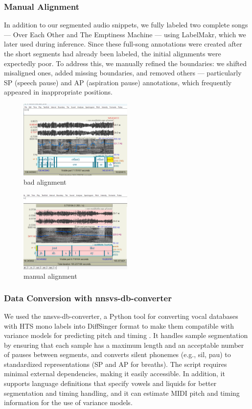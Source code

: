 \documentclass[a4paper]{article}
\begin{document}
	\subsubsection{Manual Alignment}
	In addition to our segmented audio snippets, we fully labeled two complete songs — Over Each Other and The Emptiness Machine — using LabelMakr, which we later used during inference. Since these full-song annotations were created after the short segments had already been labeled, the initial alignments were expectedly poor. To address this, we manually refined the boundaries: we shifted misaligned ones, added missing boundaries, and removed others — particularly SP (speech pause) and AP (aspiration pause) annotations, which frequently appeared in inappropriate positions.
	
	\begin{figure}[htbp]
		\centering
		\includegraphics[width=0.5\textwidth]{graphics/bad_alignment.png}
		\caption{bad alignment}
		\label{fig:bild2}
	\end{figure}
	
	\begin{figure}[htbp]
		\centering
		\includegraphics[width=0.5\textwidth]{graphics/manual_alignment.png}
		\caption{manual alignment}
		\label{fig:bild3}
	\end{figure}
	
	\subsubsection{Data Conversion with nnsvs-db-converter}
	We used the nnsvs-db-converter, a Python tool for converting vocal databases with HTS mono labels into DiffSinger format to make them compatible with variance models for predicting pitch and timing \cite{nnsvsdbconverter}. It handles sample segmentation by ensuring that each sample has a maximum length and an acceptable number of pauses between segments, and converts silent phonemes (e.g., sil, pau) to standardized representations (SP and AP for breaths). The script requires minimal external dependencies, making it easily accessible. In addition, it supports language definitions that specify vowels and liquids for better segmentation and timing handling, and it can estimate MIDI pitch and timing information for the use of variance models.
	
\end{document}
